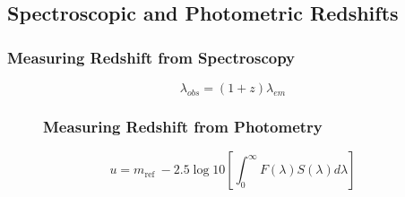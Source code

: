 \documentclass{beamer}
\begin{document}
\subsection{Spectroscopic and Photometric Redshifts}
\begin{frame}
	\frametitle{Measuring Redshift from Spectroscopy}
    \begin{figure}
    \end{figure}
    \begin{equation}
        \lambda_{obs} = (1+z)\lambda_{em}
    \end{equation}
    \end{frame}
\begin{frame}
    \begin{figure}
	\frametitle{Measuring Redshift from Photometry}
    \end{figure}
    \begin{equation}
        u=m_{\text {ref }}-2.5 \log {10}\left[\int_{0}^{\infty} F(\lambda) S(\lambda) d \lambda\right]
    \end{equation}
    \end{frame}
\end{document}
